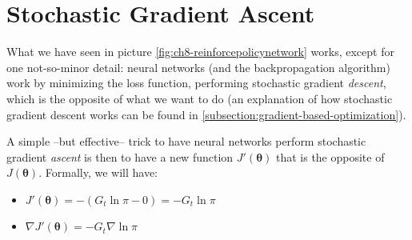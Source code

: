 \section{Stochastic Gradient Ascent}
What we have seen in picture \ref{fig:ch8-reinforcepolicynetwork} works, except for one not-so-minor detail: neural networks (and the backpropagation algorithm) work by minimizing the loss function, performing stochastic gradient \textit{descent}, which is the opposite of what we want to do (an explanation of how stochastic gradient descent works can be found in \autoref{subsection:gradient-based-optimization}).

A simple --but effective-- trick to have neural networks perform stochastic gradient \textit{ascent} is then to have a new function $J' (\boldsymbol{\theta})$ that is the opposite of $J(\boldsymbol{\theta})$. Formally, we will have:

\begin{itemize}
    \item $J' (\boldsymbol{\theta}) = -(G_t \ln{\pi} - 0) = -G_t \ln{\pi}$
    \item $\nabla J' (\boldsymbol{\theta}) = -G_t \nabla \ln{\pi}$
\end{itemize}
